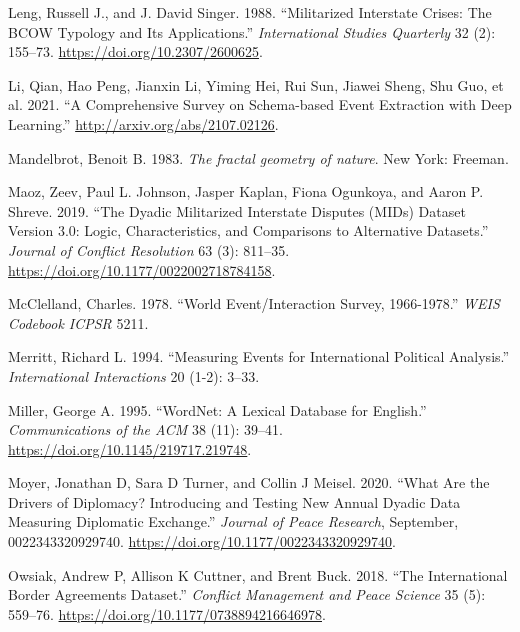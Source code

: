 \documentclass{article}
\newlength{\cslhangindent}
\newlength{\cslentryspacingunit} %
\newenvironment{CSLReferences}[2] %
 {%
  \setlength{\parindent}{0pt}
  \ifodd #1
  \let\oldpar\par
  \def\par{\hangindent=\cslhangindent\oldpar}
  \fi
  \setlength{\parskip}{#2\cslentryspacingunit}
 }%
 {}
\begin{document}
\begin{CSLReferences}{1}{0}
\leavevmode{}%
Leng, Russell J., and J. David Singer. 1988. {``Militarized {Interstate
Crises}: {The BCOW Typology} and {Its Applications}.''}
\emph{International Studies Quarterly} 32 (2): 155--73.
\url{https://doi.org/10.2307/2600625}.

\leavevmode{}%
Li, Qian, Hao Peng, Jianxin Li, Yiming Hei, Rui Sun, Jiawei Sheng, Shu
Guo, et al. 2021. {``A {Comprehensive Survey} on {Schema-based Event
Extraction} with {Deep Learning}.''}
\url{http://arxiv.org/abs/2107.02126}.

\leavevmode{}%
Mandelbrot, Benoit B. 1983. \emph{The fractal geometry of nature}. {New
York}: {Freeman}.

\leavevmode{}%
Maoz, Zeev, Paul L. Johnson, Jasper Kaplan, Fiona Ogunkoya, and Aaron P.
Shreve. 2019. {``The {Dyadic Militarized Interstate Disputes} ({MIDs})
{Dataset Version} 3.0: {Logic}, {Characteristics}, and {Comparisons} to
{Alternative Datasets}.''} \emph{Journal of Conflict Resolution} 63 (3):
811--35. \url{https://doi.org/10.1177/0022002718784158}.

\leavevmode{}%
McClelland, Charles. 1978. {``World Event/Interaction Survey,
1966-1978.''} \emph{WEIS Codebook ICPSR} 5211.

\leavevmode{}%
Merritt, Richard L. 1994. {``Measuring Events for International
Political Analysis.''} \emph{International Interactions} 20 (1-2):
3--33.

\leavevmode{}%
Miller, George A. 1995. {``{WordNet}: A Lexical Database for
{English}.''} \emph{Communications of the ACM} 38 (11): 39--41.
\url{https://doi.org/10.1145/219717.219748}.

\leavevmode{}%
Moyer, Jonathan D, Sara D Turner, and Collin J Meisel. 2020. {``What Are
the Drivers of Diplomacy? {Introducing} and Testing New Annual Dyadic
Data Measuring Diplomatic Exchange.''} \emph{Journal of Peace Research},
September, 0022343320929740.
\url{https://doi.org/10.1177/0022343320929740}.

\leavevmode{}%
Owsiak, Andrew P, Allison K Cuttner, and Brent Buck. 2018. {``The
{International Border Agreements Dataset}.''} \emph{Conflict Management
and Peace Science} 35 (5): 559--76.
\url{https://doi.org/10.1177/0738894216646978}.


\end{CSLReferences}
\end{document}
